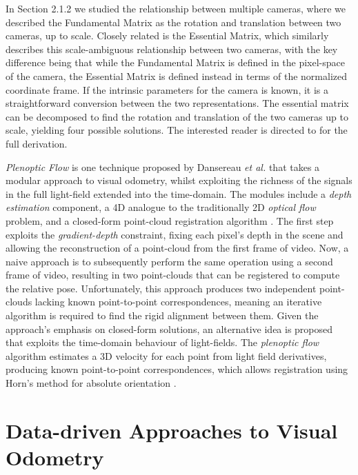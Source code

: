 In Section 2.1.2 we studied the relationship between multiple cameras, where we described the Fundamental Matrix as the rotation and translation between two cameras, up to scale. Closely related is the Essential Matrix, which similarly describes this scale-ambiguous relationship between two cameras, with the key difference being that while the Fundamental Matrix is defined in the pixel-space of the camera, the Essential Matrix is defined instead in terms of the normalized coordinate frame. If the intrinsic parameters for the camera is known, it is a straightforward conversion between the two representations. The essential matrix can be decomposed to find the rotation and translation of the two cameras up to scale, yielding four possible solutions. The interested reader is directed to \cite{zisserman2004multiview} for the full derivation.

\textit{Plenoptic Flow} is one technique proposed by Dansereau \textit{et al.} \cite{dansereau2011plenopticflow} that takes a modular approach to visual odometry, whilst exploiting the richness of the signals in the full light-field extended into the time-domain. The modules include a \textit{depth estimation} component, a 4D analogue to the traditionally 2D \textit{optical flow} problem, and a closed-form point-cloud registration algorithm \cite{horn1987absorientation}. The first step exploits the \textit{gradient-depth} constraint, fixing each pixel's depth in the scene and allowing the reconstruction of a point-cloud from the first frame of video. Now, a naive approach is to subsequently perform the same operation using a second frame of video, resulting in two point-clouds that can be registered to compute the relative pose. Unfortunately, this approach produces two independent point-clouds lacking known point-to-point correspondences, meaning an iterative algorithm is required to find the rigid alignment between them. Given the approach's emphasis on closed-form solutions, an alternative idea is proposed that exploits the time-domain behaviour of light-fields. The \textit{plenoptic flow} algorithm estimates a 3D velocity for each point from light field derivatives, producing known point-to-point correspondences, which allows registration using Horn's method for absolute orientation \cite{horn1987absorientation}.



\section{Data-driven Approaches to Visual Odometry}

